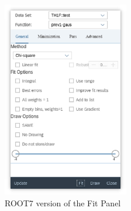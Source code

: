\documentclass[a4paper]{jpconf}
\begin{document}
\begin{figure}[h]
  \centering
\begin{minipage}{14pc}
\includegraphics[width=13pc]{rfitpanel1.eps}
\caption{\label{label}ROOT7 version of the Fit Panel}
\end{minipage}\hspace{2pc}%
\begin{minipage}{14pc}

\end{minipage}
\end{figure}
\end{document}
